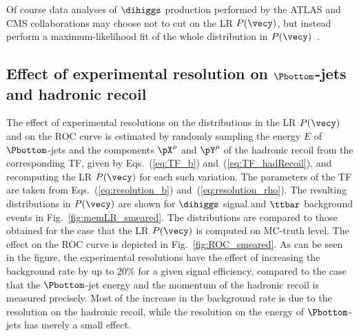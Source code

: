 Of course data analyses of $\dihiggs$ production performed by the ATLAS and CMS collaborations
may choose not to cut on the LR $P(\vecy)$,
but instead perform a maximum-likelihood fit of the whole distribution in $P(\vecy)$~\cite{ATL-PHYS-PUB-2011-011}.


\subsection{Effect of experimental resolution on $\Pbottom$-jets and hadronic recoil}

The effect of experimental resolutions on the distributions in the LR $P(\vecy)$ and on the ROC curve is estimated
by randomly sampling the energy $E$ of $\Pbottom$-jets and the components $\pX^{\rho}$ and $\pY^{\rho}$ of the hadronic recoil from the corresponding TF,
given by Eqs.~(\ref{eq:TF_b}) and~(\ref{eq:TF_hadRecoil}), and recomputing the LR $P(\vecy)$ for each such variation.
The parameters of the TF are taken from Eqs.~(\ref{eq:resolution_b}) and~(\ref{eq:resolution_rho}).
The resulting distributions in $P(\vecy)$ are shown for $\dihiggs$ signal and $\ttbar$ background events in Fig.~\ref{fig:memLR_smeared}.
The distributions are compared to those obtained for the case that the LR $P(\vecy)$ is computed on MC-truth level.
The effect on the ROC curve is depicted in Fig.~\ref{fig:ROC_smeared}.
As can be seen in the figure, the experimental resolutions have the effect of increasing the background rate by up to $20\%$ for a given signal efficiency,
compared to the case that the $\Pbottom$-jet energy and the momentum of the hadronic recoil is measured precisely.
Most of the increase in the background rate is due to the resolution on the hadronic recoil,
while the resolution on the energy of $\Pbottom$-jets has merely a small effect.

